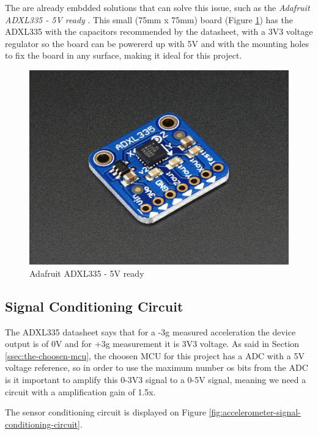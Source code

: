 	The are already embdded solutions that can solve this issue, such as the \textit{Adafruit ADXL335 - 5V ready} \cite{adafruit-5v-ready}. This small (75mm x 75mm) board (Figure \ref{fig:adafruit-adxl335}) has the ADXL335 with the capacitors recommended by the datasheet, with a 3V3 voltage regulator so the board can be powererd up with 5V and with the mounting holes to fix the board in any surface, making it ideal for this project.

	\begin{figure}[htbp]
		\centering
			\includegraphics[scale=0.95]{figuras/fig-adafruit-adxl335.jpg}
		\caption{Adafruit ADXL335 - 5V ready \cite{adafruit-adxl335}}
		\label{fig:adafruit-adxl335}
	\end{figure}


\subsection{Signal Conditioning Circuit}\label{ssec:accelerometer-signal-conditioning-circuit}

	The ADXL335 datasheet \cite{devices2010adxl335} says that for a -3g measured acceleration the device output is of 0V and for +3g measurement it is 3V3 voltage. As said in Section \ref{ssec:the-choosen-mcu}, the choosen MCU for this project has a ADC with a 5V voltage reference, so in order to use the maximum number os bits from the ADC is it important to amplify this 0-3V3 signal to a 0-5V signal, meaning we need a circuit with a amplification gain of 1.5x.
	\par
	The sensor conditioning circuit is displayed on Figure \ref{fig:accelerometer-signal-conditioning-circuit}.

